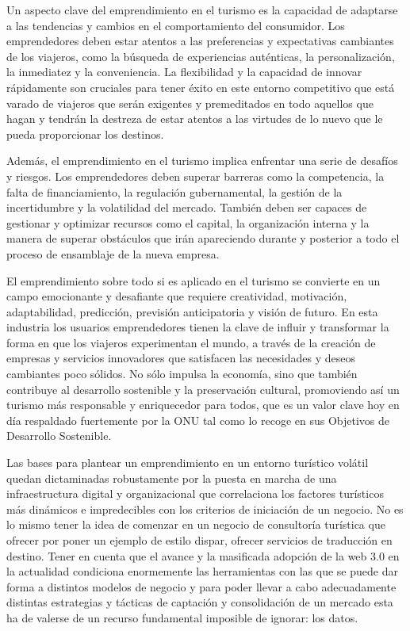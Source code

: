 \documentclass[
  letterpaper,
  DIV=11,
  numbers=noendperiod]{scrreprt}
\begin{document}
Un aspecto clave del emprendimiento en el turismo es la capacidad de
adaptarse a las tendencias y cambios en el comportamiento del
consumidor. Los emprendedores deben estar atentos a las preferencias y
expectativas cambiantes de los viajeros, como la búsqueda de
experiencias auténticas, la personalización, la inmediatez y la
conveniencia. La flexibilidad y la capacidad de innovar rápidamente son
cruciales para tener éxito en este entorno competitivo que está varado
de viajeros que serán exigentes y premeditados en todo aquellos que
hagan y tendrán la destreza de estar atentos a las virtudes de lo nuevo
que le pueda proporcionar los destinos.

Además, el emprendimiento en el turismo implica enfrentar una serie de
desafíos y riesgos. Los emprendedores deben superar barreras como la
competencia, la falta de financiamiento, la regulación gubernamental, la
gestión de la incertidumbre y la volatilidad del mercado. También deben
ser capaces de gestionar y optimizar recursos como el capital, la
organización interna y la manera de superar obstáculos que irán
apareciendo durante y posterior a todo el proceso de ensamblaje de la
nueva empresa.

El emprendimiento sobre todo si es aplicado en el turismo se convierte
en un campo emocionante y desafiante que requiere creatividad,
motivación, adaptabilidad, predicción, previsión anticipatoria y visión
de futuro. En esta industria los usuarios emprendedores tienen la clave
de influir y transformar la forma en que los viajeros experimentan el
mundo, a través de la creación de empresas y servicios innovadores que
satisfacen las necesidades y deseos cambiantes poco sólidos. No sólo
impulsa la economía, sino que también contribuye al desarrollo
sostenible y la preservación cultural, promoviendo así un turismo más
responsable y enriquecedor para todos, que es un valor clave hoy en día
respaldado fuertemente por la ONU tal como lo recoge en sus Objetivos de
Desarrollo Sostenible.

Las bases para plantear un emprendimiento en un entorno turístico
volátil quedan dictaminadas robustamente por la puesta en marcha de una
infraestructura digital y organizacional que correlaciona los factores
turísticos más dinámicos e impredecibles con los criterios de iniciación
de un negocio. No es lo mismo tener la idea de comenzar en un negocio de
consultoría turística que ofrecer por poner un ejemplo de estilo dispar,
ofrecer servicios de traducción en destino. Tener en cuenta que el
avance y la masificada adopción de la web 3.0 en la actualidad
condiciona enormemente las herramientas con las que se puede dar forma a
distintos modelos de negocio y para poder llevar a cabo adecuadamente
distintas estrategias y tácticas de captación y consolidación de un
mercado esta ha de valerse de un recurso fundamental imposible de
ignorar: los datos.
\end{document}
